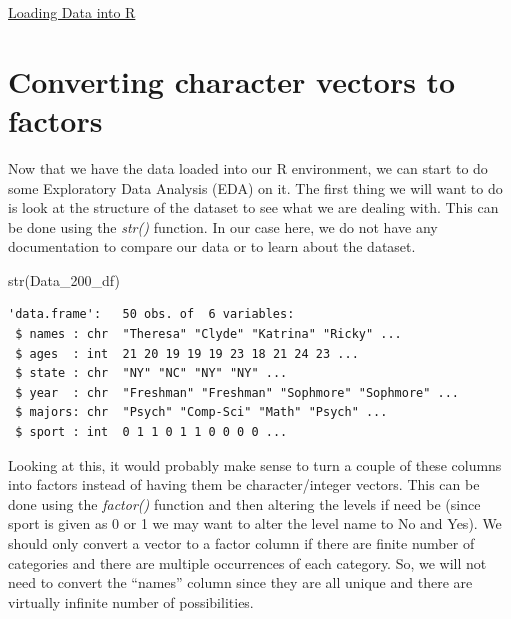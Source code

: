 \documentclass[
  letterpaper,
  DIV=11,
  numbers=noendperiod]{scrreprt}
\newenvironment{Shaded}{\begin{snugshade}}{\end{snugshade}}
\newcommand{\FunctionTok}[1]{\textcolor[rgb]{0.28,0.35,0.67}{#1}}
\newcommand{\NormalTok}[1]{\textcolor[rgb]{0.00,0.23,0.31}{#1}}
\begin{document}
\begin{watch}{}{}
    \href{https://youtu.be/603gU61EWQ4}{Loading Data into R}
\end{watch}

\section{Converting character vectors to
factors}\label{converting-character-vectors-to-factors}

Now that we have the data loaded into our R environment, we can start to
do some Exploratory Data Analysis (EDA) on it. The first thing we will
want to do is look at the structure of the dataset to see what we are
dealing with. This can be done using the \emph{str()} function. In our
case here, we do not have any documentation to compare our data or to
learn about the dataset.

\begin{Shaded}
\begin{Highlighting}[]
\FunctionTok{str}\NormalTok{(Data\_200\_df)}
\end{Highlighting}
\end{Shaded}

\begin{verbatim}
'data.frame':   50 obs. of  6 variables:
 $ names : chr  "Theresa" "Clyde" "Katrina" "Ricky" ...
 $ ages  : int  21 20 19 19 19 23 18 21 24 23 ...
 $ state : chr  "NY" "NC" "NY" "NY" ...
 $ year  : chr  "Freshman" "Freshman" "Sophmore" "Sophmore" ...
 $ majors: chr  "Psych" "Comp-Sci" "Math" "Psych" ...
 $ sport : int  0 1 1 0 1 1 0 0 0 0 ...
\end{verbatim}

Looking at this, it would probably make sense to turn a couple of these
columns into factors instead of having them be character/integer
vectors. This can be done using the \emph{factor()} function and then
altering the levels if need be (since sport is given as 0 or 1 we may
want to alter the level name to No and Yes). We should only convert a
vector to a factor column if there are finite number of categories and
there are multiple occurrences of each category. So, we will not need to
convert the ``names'' column since they are all unique and there are
virtually infinite number of possibilities.
\end{document}
